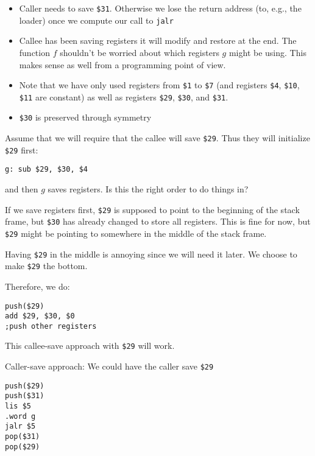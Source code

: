 \documentclass{article}
\begin{document}
\begin{itemize}
    \item Caller needs to save \texttt{\$31}. Otherwise
we lose the return address (to, e.g., the loader) once we compute our
call to \texttt{jalr} 
    \item Callee has been saving registers it will modify
and restore at the end. The function \(f\) shouldn't be worried about
which registers \(g\) might be using. This makes sense as well from a
programming point of view.
    \item Note that we have only used registers from
\texttt{\$1} to \texttt{\$7} (and registers \texttt{\$4}, \texttt{\$10},
\texttt{\$11} are constant) as well as registers \texttt{\$29},
\texttt{\$30}, and \texttt{\$31}.
    \item \texttt{\$30} is preserved through symmetry
\end{itemize}


Assume that we will require that the callee will save \texttt{\$29}.
Thus they will initialize \texttt{\$29} first:

\texttt{g:\ sub\ \$29,\ \$30,\ \$4}

and then \(g\) saves registers. Is this the right order to do things in?

If we save registers first, \texttt{\$29} is supposed to point to the
beginning of the stack frame, but \texttt{\$30} has already changed to
store all registers. This is fine for now, but \texttt{\$29} might be
pointing to somewhere in the middle of the stack frame.

Having \texttt{\$29} in the middle is annoying since we will need it
later. We choose to make \texttt{\$29} the bottom.

Therefore, we do:

\begin{tcolorbox}
\begin{verbatim}
push($29)
add $29, $30, $0
;push other registers
\end{verbatim}
\end{tcolorbox}

This callee-save approach with \texttt{\$29} will work.

Caller-save approach: We could have the caller save \texttt{\$29}

\begin{tcolorbox}
\begin{verbatim}
push($29)
push($31)
lis $5
.word g
jalr $5
pop($31)
pop($29)
\end{verbatim}
\end{tcolorbox}
\end{document}
